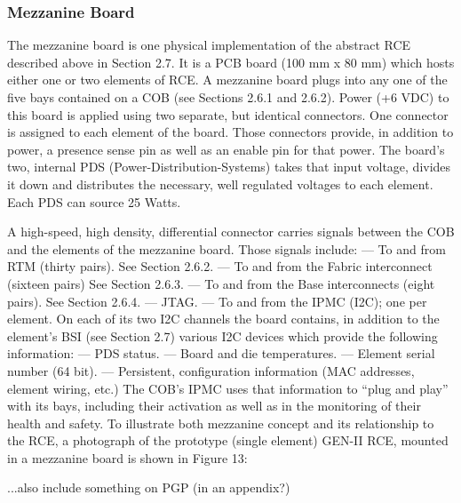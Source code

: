 \subsubsection{Mezzanine Board}

The mezzanine board is one physical implementation of the abstract RCE described above in Section 2.7. It is a PCB board (100 mm x 80 mm) which hosts either one or two elements of RCE. A mezzanine board plugs into any one of the five bays contained on a COB (see Sections 2.6.1 and 2.6.2).
Power (+6 VDC) to this board is applied using two separate, but identical connectors. One connector is assigned to each element of the board. Those connectors provide, in addition to power, a presence sense pin as well as an enable pin for that power. The board's two, internal PDS (Power-Distribution-Systems) takes that input voltage, divides it down and distributes the necessary, well regulated voltages to each element. Each PDS can source 25 Watts.

A high-speed, high density, differential connector carries signals between the COB and the elements of the mezzanine board. Those signals include:
— To and from RTM (thirty pairs). See Section 2.6.2.
— To and from the Fabric interconnect (sixteen pairs) See Section 2.6.3.
— To and from the Base interconnects (eight pairs). See Section 2.6.4.
— JTAG.
— To and from the IPMC (I2C); one per element.
On each of its two I2C channels the board contains, in addition to the element's BSI (see Section 2.7) various I2C devices which provide the following information:
— PDS status.
— Board and die temperatures.
— Element serial number (64 bit).
— Persistent, configuration information (MAC addresses, element wiring, etc.)
The COB's IPMC uses that information to “plug and play” with its bays, including their activation as well as in the monitoring of their health and safety.
To illustrate both mezzanine concept and its relationship to the RCE, a photograph of the prototype (single element) GEN-II RCE, mounted in a mezzanine board is shown in Figure 13:

...also include something on PGP (in an appendix?)
